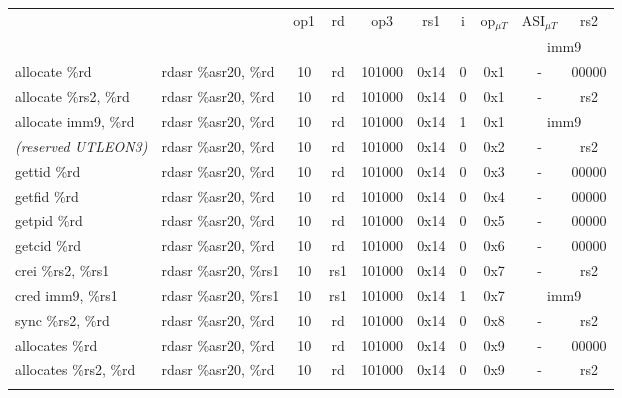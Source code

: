 \documentclass[a4paper,11pt]{article}
\newcommand{\leon}{UTLEON3}
\newcommand{\res}{\normalfont \emph{(reserved \leon)}}
\begin{document}
\begin{table}
\begin{center}{\scriptsize
\begin{tabular}{|>{\ttfamily}l|>{\ttfamily}l||c|c|c|c|c|c|c|c|}
\hline
\multicolumn{2}{|c||}{Assembly format} & \multicolumn{8}{c|}{Encoding} \\
\hline
\multirow{2}{*}{\normalfont Pattern} & \multirow{2}{*}{\normalfont Overlaps/Extends} & \multirow{2}{*}{op1} & \multirow{2}{*}{rd} & \multirow{2}{*}{op3} & \multirow{2}{*}{rs1} & \multirow{2}{*}{i} & \multirow{2}{*}{op$_{\mu T}$} & ASI$_{\mu T}$ & rs2 \\
\cline{9-10}
 & & & & & & & & \multicolumn{2}{c|}{imm9} \\
\hline\hline
allocate  \%rd        & rdasr \%asr20, \%rd  & 10 &   rd & 101000 & 0x14 & 0 & 0x1 & - & 00000 \\
allocate  \%rs2, \%rd & rdasr \%asr20, \%rd  & 10 &   rd & 101000 & 0x14 & 0 & 0x1 & - & rs2 \\ \cline{9-10}
allocate  imm9, \%rd  & rdasr \%asr20, \%rd  & 10 &   rd & 101000 & 0x14 & 1 & 0x1 & \multicolumn{2}{c|}{imm9} \\ \cline{9-10}
\res                  & rdasr \%asr20, \%rd  & 10 &   rd & 101000 & 0x14 & 0 & 0x2 & - & rs2 \\
gettid \%rd           & rdasr \%asr20, \%rd  & 10 &   rd & 101000 & 0x14 & 0 & 0x3 & - & 00000 \\
getfid \%rd           & rdasr \%asr20, \%rd  & 10 &   rd & 101000 & 0x14 & 0 & 0x4 & - & 00000 \\
getpid \%rd           & rdasr \%asr20, \%rd  & 10 &   rd & 101000 & 0x14 & 0 & 0x5 & - & 00000 \\
getcid \%rd           & rdasr \%asr20, \%rd  & 10 &   rd & 101000 & 0x14 & 0 & 0x6 & - & 00000 \\
crei \%rs2, \%rs1     & rdasr \%asr20, \%rs1 & 10 &  rs1 & 101000 & 0x14 & 0 & 0x7 & - & rs2 \\ \cline{9-10}
cred  imm9, \%rs1     & rdasr \%asr20, \%rs1 & 10 &  rs1 & 101000 & 0x14 & 1 & 0x7 & \multicolumn{2}{c|}{imm9} \\ \cline{9-10}
sync \%rs2, \%rd      & rdasr \%asr20, \%rd  & 10 &   rd & 101000 & 0x14 & 0 & 0x8 & - & rs2 \\
allocates \%rd        & rdasr \%asr20, \%rd  & 10 &   rd & 101000 & 0x14 & 0 & 0x9 & - & 00000 \\
allocates \%rs2, \%rd & rdasr \%asr20, \%rd  & 10 &   rd & 101000 & 0x14 & 0 & 0x9 & - & rs2 \\ \cline{9-10}

\end{tabular}}
\end{center}
\end{table}
\end{document}
